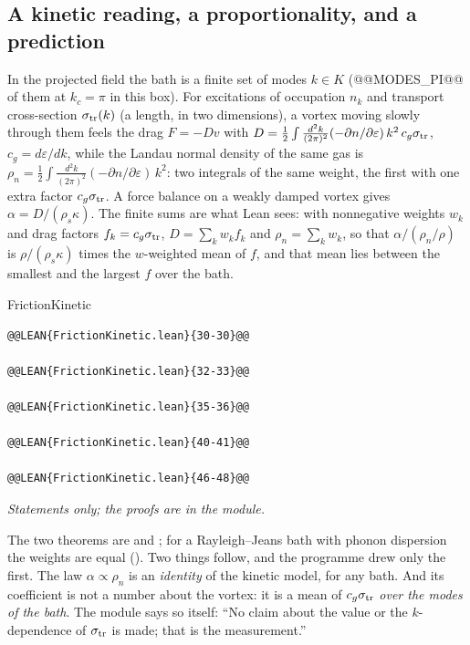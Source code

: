 \subsection*{A kinetic reading, a proportionality, and a prediction}

In the projected field the bath is a finite set of modes $k\in K$ (@@MODES_PI@@ of them at $k_c=\pi$ in this box). For excitations of occupation $n_k$ and transport cross-section $\sigma_{\rm tr}(k)$ (a length, in two dimensions), a vortex moving slowly through them feels the drag $F=-Dv$ with
$D=\tfrac12\int\frac{d^2k}{(2\pi)^2}(-\partial n/\partial\varepsilon)\,k^2\,c_g\sigma_{\rm tr}$, $c_g=d\varepsilon/dk$, while the Landau normal density of the same gas is $\rho_n=\tfrac12\int\frac{d^2k}{(2\pi)^2}(-\partial n/\partial\varepsilon)\,k^2$: two integrals of the same weight, the first with one extra factor $c_g\sigma_{\rm tr}$.
A force balance on a weakly damped vortex gives $\alpha=D/(\rho_s\kappa)$. The finite sums are what Lean sees: with nonnegative weights $w_k$ and drag factors $f_k=c_g\sigma_{\rm tr}$, $D=\sum_kw_kf_k$ and $\rho_n=\sum_kw_k$, so that $\alpha/(\rho_n/\rho)$ is $\rho/(\rho_s\kappa)$ times the $w$-weighted mean of $f$, and that mean lies between the smallest and the largest $f$ over the bath.

\begin{leanbox}[unbreakable]{FrictionKinetic}
\begin{lstlisting}[style=lean,basicstyle=\ttfamily\footnotesize]
@@LEAN{FrictionKinetic.lean}{30-30}@@

@@LEAN{FrictionKinetic.lean}{32-33}@@

@@LEAN{FrictionKinetic.lean}{35-36}@@

@@LEAN{FrictionKinetic.lean}{40-41}@@

@@LEAN{FrictionKinetic.lean}{46-48}@@
\end{lstlisting}
\nopagebreak[4]\smallskip\noindent\textit{Statements only; the proofs are in the module.}
\end{leanbox}

The two theorems are  and ; for a Rayleigh--Jeans bath with phonon dispersion the weights are equal (). Two things follow, and the programme drew only the first. The law $\alpha\propto\rho_n$ is an
\emph{identity} of the kinetic model, for any bath. And its coefficient is not a number about the vortex: it is a mean of $c_g\sigma_{\rm tr}$ \emph{over the modes of the bath}. The module says so itself: ``No claim about the value or the $k$-dependence of $\sigma_{\rm tr}$ is made; that is the measurement.''

